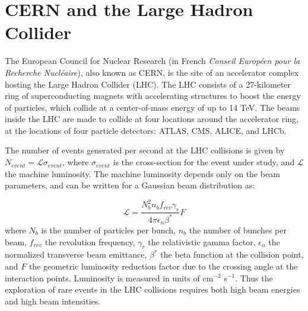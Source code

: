 \documentclass{article}
\begin{document}
\section{CERN and the Large Hadron Collider}

The European Council for Nuclear Research (in French \textit{Conseil Europ\'{e}en pour la Recherche Nucl\'{e}aire}), also known as CERN, is the site of an accelerator complex hosting the Large Hadron Collider (LHC). The LHC consists of a 27-kilometer ring of superconducting magnets with accelerating structures to boost the energy of particles, which collide at a center-of-mass energy of up to 14 TeV. The beams inside the LHC are made to collide at four locations around the accelerator ring, at the locations of four particle detectors: ATLAS, CMS, ALICE, and LHCb.

The number of events generated per second at the LHC collisions is given by $N_{event} = \mathcal{L} \sigma_{event}$, where $\sigma_{event}$ is the cross-section for the event under study, and $\mathcal{L}$ the machine luminosity. The machine luminosity depends only on the beam parameters, and can be written for a Gaussian beam distribution as:

\begin{equation}
    \mathcal{L} = \frac{N_b^2 n_b f_{rev} \gamma_r}{4\pi \epsilon_n \beta^*} F
\end{equation}
where $N_b$ is the number of particles per bunch, $n_b$ the number of bunches per beam, $f_{rev}$ the revolution frequency, $\gamma_r$ the relativistic gamma factor, $\epsilon_n$ the normalized transverse beam emittance, $\beta^*$ the beta function at the collision point, and $F$ the geometric luminosity reduction factor due to the crossing angle at the interaction points. Luminosity is measured in units of cm$^{-2}$ s$^{-1}$. Thus the exploration of rare events in the LHC collisions requires both high beam energies and high beam intensities.
\end{document}
